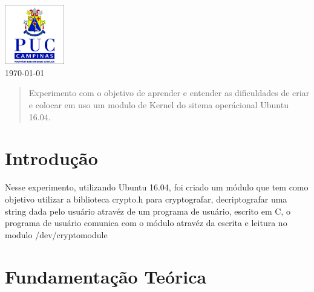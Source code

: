 \begin{titlepage}



\includegraphics[width=26mm]{logo.jpg}\\[1cm]%
{\large \today}\\[1cm]

\vfill %

\end{titlepage}


\begin{abstract}
Experimento com o objetivo de aprender e entender as dificuldades de criar e colocar em uso um modulo de Kernel do sitema operácional Ubuntu 16.04.
\end{abstract}

\section{Introdução}

Nesse experimento, utilizando Ubuntu 16.04, foi criado um módulo que tem como objetivo utilizar a biblioteca crypto.h para cryptografar, decriptografar uma string dada pelo usuário atravéz de um programa de usuário, escrito em C, o programa de usuário comunica com o módulo atravéz da escrita e leitura no modulo /dev/cryptomodule 

\section{Fundamentação Teórica}

